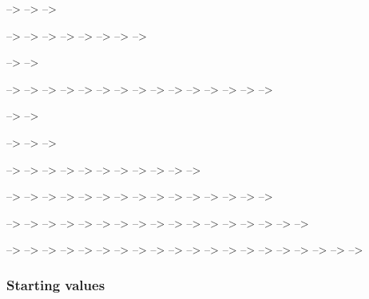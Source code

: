 \documentclass[
  ,man]{apa6}
\begin{document}
--\textgreater{}
--\textgreater{}
--\textgreater{}

--\textgreater{}
--\textgreater{}
--\textgreater{}
--\textgreater{}
--\textgreater{}
--\textgreater{}
--\textgreater{}
--\textgreater{}

--\textgreater{}
--\textgreater{}

--\textgreater{}
--\textgreater{}
--\textgreater{}
--\textgreater{}
--\textgreater{}
--\textgreater{}
--\textgreater{}
--\textgreater{}
--\textgreater{}
--\textgreater{}
--\textgreater{}
--\textgreater{}
--\textgreater{}
--\textgreater{}
--\textgreater{}

--\textgreater{}
--\textgreater{}

--\textgreater{}
--\textgreater{}
--\textgreater{}

--\textgreater{}
--\textgreater{}
--\textgreater{}
--\textgreater{}
--\textgreater{}
--\textgreater{}
--\textgreater{}
--\textgreater{}
--\textgreater{}
--\textgreater{}
--\textgreater{}

--\textgreater{}
--\textgreater{}
--\textgreater{}
--\textgreater{}
--\textgreater{}
--\textgreater{}
--\textgreater{}
--\textgreater{}
--\textgreater{}
--\textgreater{}
--\textgreater{}
--\textgreater{}
--\textgreater{}
--\textgreater{}
--\textgreater{}

--\textgreater{}
--\textgreater{}
--\textgreater{}
--\textgreater{}
--\textgreater{}
--\textgreater{}
--\textgreater{}
--\textgreater{}
--\textgreater{}
--\textgreater{}
--\textgreater{}
--\textgreater{}
--\textgreater{}
--\textgreater{}
--\textgreater{}
--\textgreater{}
--\textgreater{}

--\textgreater{}
--\textgreater{}
--\textgreater{}
--\textgreater{}
--\textgreater{}
--\textgreater{}
--\textgreater{}
--\textgreater{}
--\textgreater{}
--\textgreater{}
--\textgreater{}
--\textgreater{}
--\textgreater{}
--\textgreater{}
--\textgreater{}
--\textgreater{}
--\textgreater{}
--\textgreater{}
--\textgreater{}
--\textgreater{}

\hypertarget{starting-values-1}{%
\subsubsection{Starting values}\label{starting-values-1}}
\end{document}
